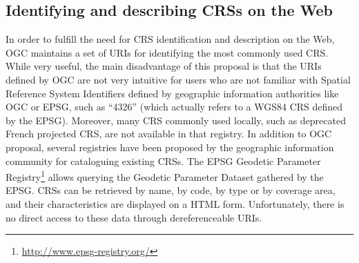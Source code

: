 \subsection{Identifying and describing CRSs on the Web}
In order to fulfill the need for CRS identification and description on the Web, OGC maintains a set of URIs for identifying the most commonly used CRS. While very useful, the main disadvantage of this proposal is that the URIs defined by OGC are not very intuitive for users who are not familiar with Spatial Reference System Identifiers defined by geographic information authorities like OGC or EPSG, such as ``4326'' (which actually refers to a WGS84 CRS defined by the EPSG). Moreover, many CRS commonly used locally, such as deprecated French projected CRS, are not available in that registry. In addition to OGC proposal, several registries have been proposed by the geographic information community for cataloguing existing CRSs.
The EPSG Geodetic Parameter Registry\footnote{\url{http://www.epsg-registry.org/}} allows querying the Geodetic Parameter Dataset gathered by the EPSG. CRSs can be retrieved by name, by code, by type or by coverage area, and their characteristics are displayed on a HTML form. Unfortunately, there is no direct access to these data through dereferenceable URIs.

